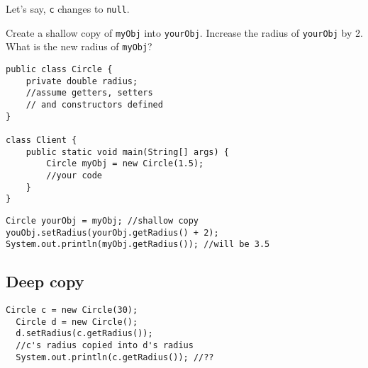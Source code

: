 Let's say, \texttt{c} changes to \texttt{null}.

\begin{center}
\bgroup \tikzset{png export}  \egroup
\end{center}
  
\begin{exercise}
Create a shallow copy of \texttt{myObj} into \texttt{yourObj}. Increase the radius of \texttt{yourObj} by 2. What is the new radius of \texttt{myObj}?

\begin{lstlisting}[frame=single,style=buggy,backgroundcolor = \color{green!10!white}]
public class Circle {
	private double radius;
	//assume getters, setters 
	// and constructors defined
}

class Client {
	public static void main(String[] args) {
		Circle myObj = new Circle(1.5);
		//your code
	}
}
\end{lstlisting}  	
\end{exercise}
\begin{answer} \begin{lstlisting}
Circle yourObj = myObj; //shallow copy
youObj.setRadius(yourObj.getRadius() + 2);
System.out.println(myObj.getRadius()); //will be 3.5
\end{lstlisting} \end{answer}


\subsection{Deep copy}
  \begin{lstlisting}[style=correct,basicstyle=\footnotesize]
  Circle c = new Circle(30);
  Circle d = new Circle();
  d.setRadius(c.getRadius());
  //c's radius copied into d's radius
  System.out.println(c.getRadius()); //??
  \end{lstlisting}    
  
